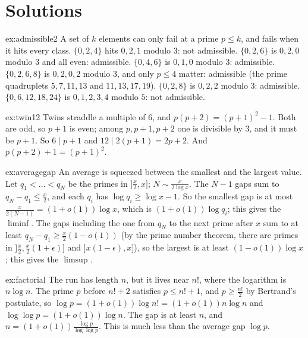 \section{Solutions}

\begin{solution}{ex:admissible2}
\idea A set of $k$ elements can only fail at a prime $p\le k$, and fails when it hits every class.
\writeup $\{0,2,4\}$ hits $0,2,1$ modulo $3$: not admissible. $\{0,2,6\}$ is $0,2,0$ modulo $3$ and all even: admissible. $\{0,4,6\}$ is $0,1,0$ modulo
$3$: admissible. $\{0,2,6,8\}$ is $0,2,0,2$ modulo $3$, and only $p\le4$ matter: admissible (the prime quadruplets $5,7,11,13$ and $11,13,17,19$).
$\{0,2,8\}$ is $0,2,2$ modulo $3$: admissible. $\{0,6,12,18,24\}$ is $0,1,2,3,4$ modulo $5$: not admissible.
\end{solution}

\begin{solution}{ex:twin12}
\idea Twins straddle a multiple of $6$, and $p(p+2)=(p+1)^2-1$.
\writeup Both are odd, so $p+1$ is even; among $p,p+1,p+2$ one is divisible by $3$, and it must be $p+1$. So $6\mid p+1$ and $12\mid2(p+1)=2p+2$. And
$p(p+2)+1=(p+1)^2$.
\end{solution}

\begin{solution}{ex:averagegap}
\idea An average is squeezed between the smallest and the largest value.
\writeup Let $q_1<\dots<q_N$ be the primes in $]\frac x2,x]$; $N\sim\frac x{2\log x}$. The $N-1$ gaps sum to $q_N-q_1\le\frac x2$, and each $q_i$ has
$\log q_i\ge\log x-1$. So the smallest gap is at most $\frac x{2(N-1)}=(1+o(1))\log x$, which is $(1+o(1))\log q_i$; this gives the $\liminf$. The gaps
including the one from $q_N$ to the next prime after $x$ sum to at least $q_{N}-q_1\ge\frac x2(1-o(1))$ (by the prime number theorem, there are primes
in $]\frac x2,\frac x2(1+\epsilon)]$ and $]x(1-\epsilon),x]$), so the largest is at least $(1-o(1))\log x$; this gives the $\limsup$.
\end{solution}

\begin{solution}{ex:factorial}
\idea The run has length $n$, but it lives near $n!$, where the logarithm is $n\log n$.
\writeup The prime $p$ before $n!+2$ satisfies $p\le n!+1$, and $p\ge\frac{n!}2$ by Bertrand's postulate, so $\log p=(1+o(1))\log n!=(1+o(1))n\log n$ and
$\log\log p=(1+o(1))\log n$. The gap is at least $n$, and $n=(1+o(1))\frac{\log p}{\log\log p}$. This is much less than the average gap $\log p$.
\end{solution}

